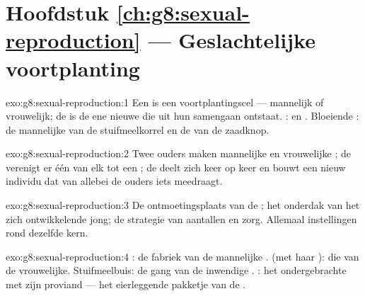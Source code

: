 \section*{Hoofdstuk \ref{ch:g8:sexual-reproduction} --- Geslachtelijke voortplanting}

\begin{solution}{exo:g8:sexual-reproduction:1}
Een  is een voortplantingscel --- mannelijk of vrouwelijk; de 
is de ene nieuwe  die uit hun samengaan ontstaat. :  en
. Bloeiende : de mannelijke  van de stuifmeelkorrel en de
 van de zaadknop.
\end{solution}

\begin{solution}{exo:g8:sexual-reproduction:2}
Twee ouders maken mannelijke en vrouwelijke ; de 
verenigt er één van elk tot een ; de  deelt zich keer op keer
en bouwt een nieuw individu dat van allebei de ouders iets meedraagt.
\end{solution}

\begin{solution}{exo:g8:sexual-reproduction:3}
De ontmoetingsplaats van de ; het onderdak van het zich
ontwikkelende jong; de strategie van aantallen en zorg. Allemaal
instellingen rond dezelfde kern.
\end{solution}

\begin{solution}{exo:g8:sexual-reproduction:4}
: de fabriek van de mannelijke .  (met haar
): die van de vrouwelijke. Stuifmeelbuis: de gang van de
inwendige . : het ondergebrachte  met zijn proviand
--- het eierleggende pakketje van de .
\end{solution}

